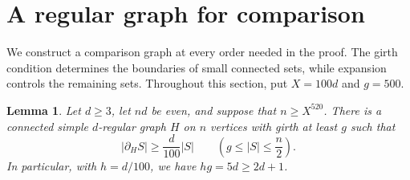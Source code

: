 \documentclass[11pt,reqno]{amsart}
\newtheorem{lemma}[theorem]{Lemma}
\theoremstyle{remark}
\numberwithin{equation}{section}
\begin{document}
\section{A regular graph for comparison}\label{sec:lower}

We construct a comparison graph at every order needed in the proof.  The
girth condition determines the boundaries of small connected sets, while
expansion controls the remaining sets.  Throughout this section, put
$X=100d$ and $g=500$.

\begin{lemma}\label{lem:benchmark}
Let $d\ge3$, let $nd$ be even, and suppose that $n\ge X^{520}$.
There is a connected simple $d$-regular graph $H$ on $n$ vertices with
girth at least $g$ such that
\begin{equation}\label{eq:benchmark-cut}
 |\partial_H S|\ge \frac d{100}|S|
 \qquad\left(g\le |S|\le \frac n2\right).
\end{equation}
In particular, with $h=d/100$, we have $hg=5d\ge2d+1$.
\end{lemma}
\end{document}
